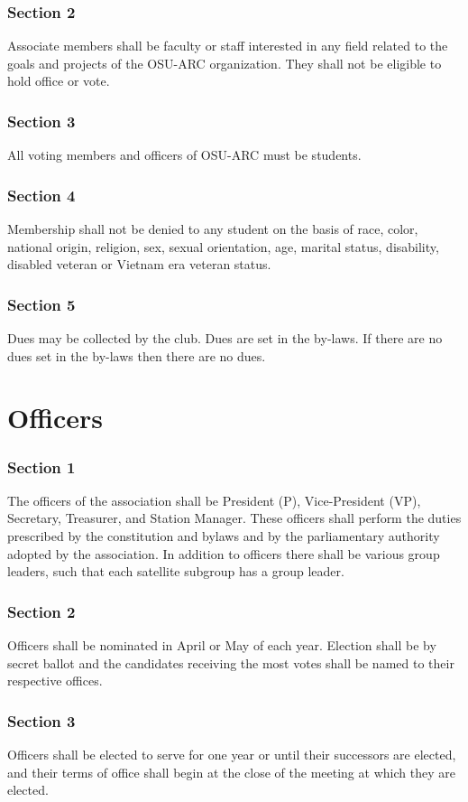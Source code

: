 \documentclass[10pt,letterpaper]{article}
\begin{document}
\section*{Section 2} Associate members shall be faculty or staff interested in any field related to the goals and projects of the OSU-ARC organization. They shall not be eligible to hold office or vote.
\section*{Section 3} All voting members and officers of OSU-ARC must be students.
\section*{Section 4} Membership shall not be denied to any student on the basis of race, color, national origin, religion, sex, sexual orientation, age, marital status, disability, disabled veteran or Vietnam era veteran status.
\section*{Section 5} Dues may be collected by the club. Dues are set in the by-laws. If there are no dues set in the by-laws then there are no dues.


\part{Officers}

\section*{Section 1} The officers of the association shall be President (P), Vice-President (VP), Secretary, Treasurer, and Station Manager. These officers shall perform the duties prescribed by the constitution and bylaws and by the parliamentary authority adopted by the association. In addition to officers there shall be various group leaders, such that each satellite subgroup has a group leader.
\section*{Section 2} Officers shall be nominated in April or May of each year. Election shall be by secret ballot and the candidates receiving the most votes shall be named to their respective offices.
\section*{Section 3} Officers shall be elected to serve for one year or until their successors are elected, and their terms of office shall begin at the close of the meeting at which they are elected.
\end{document}

